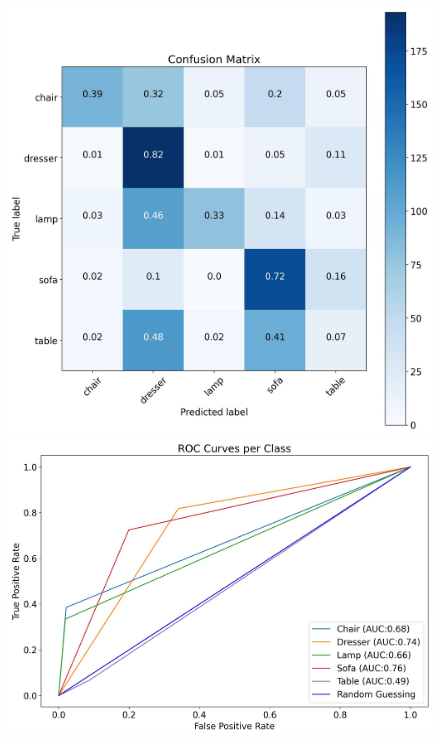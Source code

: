 \documentclass[11pt,a4paper]{article}
\begin{document}
\begin{figure}[H]
{{    \includegraphics[scale=0.13]{imgs/experiments/images/8-1/Experiment-8-1-TESTING-confusion-matrix.jpg}
    \includegraphics[scale=0.13]{imgs/experiments/images/8-1/Experiment-8-1-TESTING-ROC.jpg}
    }}
    \qquad
\end{figure}
\end{document}
